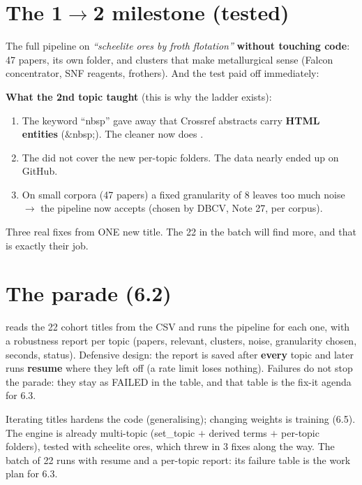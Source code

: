 \documentclass[11pt,a4paper]{article}
\begin{document}
\section{The 1\texorpdfstring{$\rightarrow$}{->}2 milestone (tested)}

The full pipeline on \emph{``scheelite ores by froth flotation''} \textbf{without touching
code}: 47 papers, its own folder, and clusters that make metallurgical sense (Falcon
concentrator, SNF reagents, frothers). And the test paid off immediately:

\begin{ojo}
\textbf{What the 2nd topic taught} (this is why the ladder exists):
\begin{enumerate}
  \item The keyword ``nbsp'' gave away that Crossref abstracts carry \textbf{HTML entities}
        ($\&$nbsp;). The cleaner now does .
  \item The  did not cover the new per-topic folders. The data nearly ended
        up on GitHub.
  \item On small corpora (47 papers) a fixed granularity of 8 leaves too much noise
        $\rightarrow$ the pipeline now accepts  (chosen by
        DBCV, Note 27, per corpus).
\end{enumerate}
Three real fixes from ONE new title. The 22 in the batch will find more, and that is exactly
their job.
\end{ojo}

\section{The parade (6.2)}

 reads the 22 cohort titles from the CSV and runs the pipeline for each
one, with a robustness report per topic (papers, relevant, clusters, noise, granularity chosen,
seconds, status). Defensive design: the report is saved after \textbf{every} topic and later
runs \textbf{resume} where they left off (a rate limit loses nothing). Failures do not stop the
parade: they stay as FAILED in the table, and that table is the fix-it agenda for 6.3.

\begin{resumen}
Iterating titles hardens the code (generalising); changing weights is training (6.5). The
engine is already multi-topic (set\_topic $+$ derived terms $+$ per-topic folders), tested with
scheelite ores, which threw in 3 fixes along the way. The batch of 22 runs with resume and a
per-topic report: its failure table is the work plan for 6.3.
\end{resumen}
\clearpage
{}
{}
\end{document}
